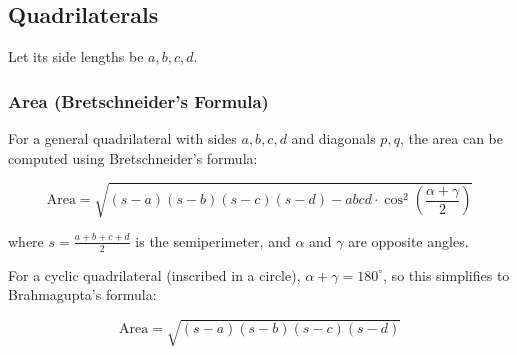 \subsection{Quadrilaterals}

Let its side lengths be $a, b, c, d$.

\subsubsection{Area (Bretschneider's Formula)}

For a general quadrilateral with sides $a, b, c, d$ and diagonals $p, q$, the area can be computed using Bretschneider's formula:

\[
\text{Area} = \sqrt{(s-a)(s-b)(s-c)(s-d) - abcd \cdot \cos^2\left(\frac{\alpha + \gamma}{2}\right)}
\]

where $s = \frac{a+b+c+d}{2}$ is the semiperimeter, and $\alpha$ and $\gamma$ are opposite angles.

For a cyclic quadrilateral (inscribed in a circle), $\alpha + \gamma = 180^\circ$, so this simplifies to Brahmagupta's formula:

\[
\text{Area} = \sqrt{(s-a)(s-b)(s-c)(s-d)}
\]
